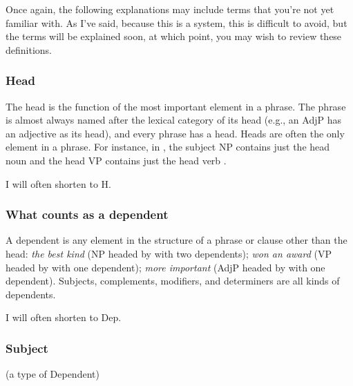 Once again, the following explanations may include terms that you're not yet familiar with. As I've said, because this is a system, this is difficult to avoid, but the terms will be explained soon, at which point, you may wish to review these definitions.

\subsubsection*{Head}\label{sec:head}

The head is the function of the most important element in a phrase. The phrase is almost always named after the lexical category of its head (e.g., an AdjP has an adjective as its head), and every phrase has a head. Heads are often the only element in a phrase. For instance, in , the subject NP contains just the head noun  and the head VP contains just the head verb .

I will often shorten  to H.

\subsubsection*{What counts as a dependent}
\label{sec:Dep}

A dependent is any element in the structure of a phrase or clause other than the head: \textit{\emph{the} \emph{best} kind} (NP headed by  with two dependents); \textit{won \emph{an award}} (VP headed by  with one dependent); \textit{\emph{more} important} (AdjP headed by  with one dependent). Subjects, complements, modifiers, and determiners are all kinds of dependents.

I will often shorten  to Dep.

\subsubsection{Subject}\label{sec:subjects}
(a type of Dependent)

